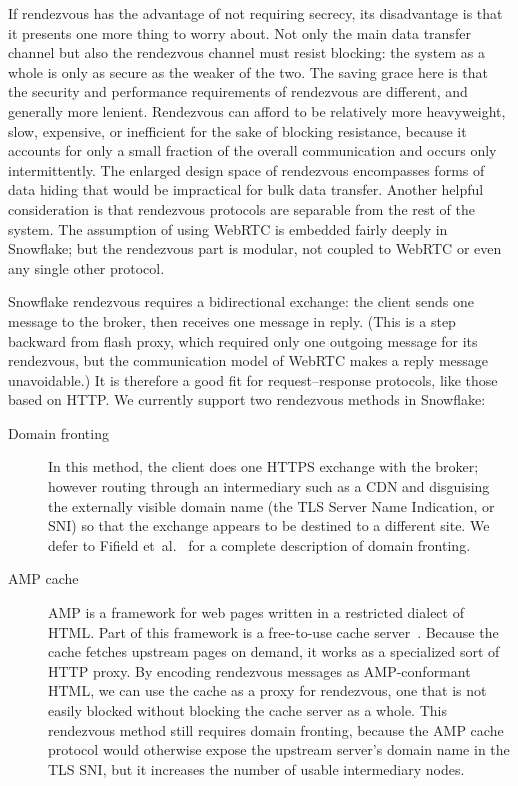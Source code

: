 \documentclass[letterpaper,twocolumn]{article}
\begin{document}
If rendezvous has the advantage of not requiring secrecy,
its disadvantage is that it presents one more thing to worry about.
Not only the main data transfer channel
but also the rendezvous channel must resist blocking:
the system as a whole is only as secure as the weaker of the two.
The saving grace here is that the security and performance requirements
of rendezvous are different, and generally more lenient.
Rendezvous can afford to be relatively more heavyweight,
slow, expensive, or inefficient for the sake of blocking resistance,
because it accounts for only a small fraction of the overall communication
and occurs only intermittently.
The enlarged design space of rendezvous encompasses
forms of data hiding that would be impractical
for bulk data transfer.
Another helpful consideration is that rendezvous protocols
are separable from the rest of the system.
The assumption of using WebRTC is embedded fairly deeply in Snowflake;
but the rendezvous part is modular,
not coupled to WebRTC or even any single other protocol.

Snowflake rendezvous requires a bidirectional exchange:
the client sends one message to the broker, then receives
one message in reply.
(This is a step backward from flash proxy,
which required only one outgoing message for its rendezvous,
but the communication model of WebRTC makes a reply message unavoidable.)
It is therefore a good fit for request--response protocols,
like those based on HTTP.
We currently support two rendezvous methods in Snowflake:

\begin{description}
\item[Domain fronting]
In this method, the client does one HTTPS exchange
with the broker; however routing through an intermediary such as a CDN
and disguising the externally visible domain name
(the TLS Server Name Indication, or SNI) so that the exchange
appears to be destined to a different site.
We defer to Fifield et~al.~\cite{Fifield2015a}
for a complete description of domain fronting.
\item[AMP cache]
AMP is a framework for web pages written in a restricted dialect of HTML.
Part of this framework is a free-to-use
cache server~\cite{amp-cache}.
Because the cache fetches upstream pages on demand,
it works as a specialized sort of HTTP proxy.
By encoding rendezvous messages as AMP-conformant HTML,
we can use the cache as a proxy for rendezvous,
one that is not easily blocked without blocking the cache server as a whole.
This rendezvous method still requires domain fronting,
because the AMP cache protocol would otherwise expose the
upstream server's domain name in the TLS SNI,
but it increases the number of usable intermediary nodes.
\end{description}
\end{document}
